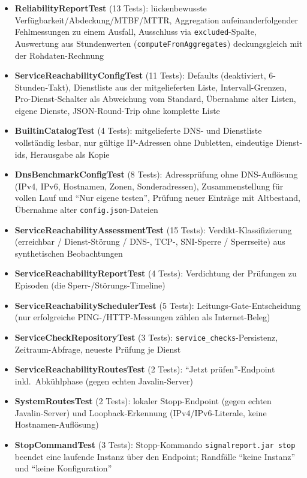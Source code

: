 \begin{itemize}
    \item \textbf{ReliabilityReportTest} (13 Tests): lückenbewusste Verfügbarkeit/Abdeckung/MTBF/MTTR, Aggregation aufeinanderfolgender Fehlmessungen zu einem Ausfall, Ausschluss via \texttt{excluded}-Spalte, Auswertung aus Stundenwerten (\texttt{computeFromAggregates}) deckungsgleich mit der Rohdaten-Rechnung
    \item \textbf{ServiceReachabilityConfigTest} (11 Tests): Defaults (deaktiviert, 6-Stunden-Takt), Dienstliste aus der mitgelieferten Liste, Intervall-Grenzen, Pro-Dienst-Schalter als Abweichung vom Standard, Übernahme alter Listen, eigene Dienste, JSON-Round-Trip ohne komplette Liste
    \item \textbf{BuiltinCatalogTest} (4 Tests): mitgelieferte DNS- und Dienstliste vollständig lesbar, nur gültige IP-Adressen ohne Dubletten, eindeutige Dienst-ids, Herausgabe als Kopie
    \item \textbf{DnsBenchmarkConfigTest} (8 Tests): Adressprüfung ohne DNS-Auflösung (IPv4, IPv6, Hostnamen, Zonen, Sonderadressen), Zusammenstellung für vollen Lauf und \enquote{Nur eigene testen}, Prüfung neuer Einträge mit Altbestand, Übernahme alter \texttt{config.json}-Dateien
    \item \textbf{ServiceReachabilityAssessmentTest} (15 Tests): Verdikt-Klassifizierung (erreichbar / Dienst-Störung / DNS-, TCP-, SNI-Sperre / Sperrseite) aus synthetischen Beobachtungen
    \item \textbf{ServiceReachabilityReportTest} (4 Tests): Verdichtung der Prüfungen zu Episoden (die Sperr-/Störungs-Timeline)
    \item \textbf{ServiceReachabilitySchedulerTest} (5 Tests): Leitungs-Gate-Entscheidung (nur erfolgreiche PING-/HTTP-Messungen zählen als Internet-Beleg)
    \item \textbf{ServiceCheckRepositoryTest} (3 Tests): \texttt{service\_checks}-Persistenz, Zeitraum-Abfrage, neueste Prüfung je Dienst
    \item \textbf{ServiceReachabilityRoutesTest} (2 Tests): \enquote{Jetzt prüfen}-Endpoint inkl.\ Abkühlphase (gegen echten Javalin-Server)
    \item \textbf{SystemRoutesTest} (2 Tests): lokaler Stopp-Endpoint (gegen echten Javalin-Server) und Loopback-Erkennung (IPv4/IPv6-Literale, keine Hostnamen-Auflösung)
    \item \textbf{StopCommandTest} (3 Tests): Stopp-Kommando \texttt{signalreport.jar stop} beendet eine laufende Instanz über den Endpoint; Randfälle \enquote{keine Instanz} und \enquote{keine Konfiguration}

\end{itemize}

